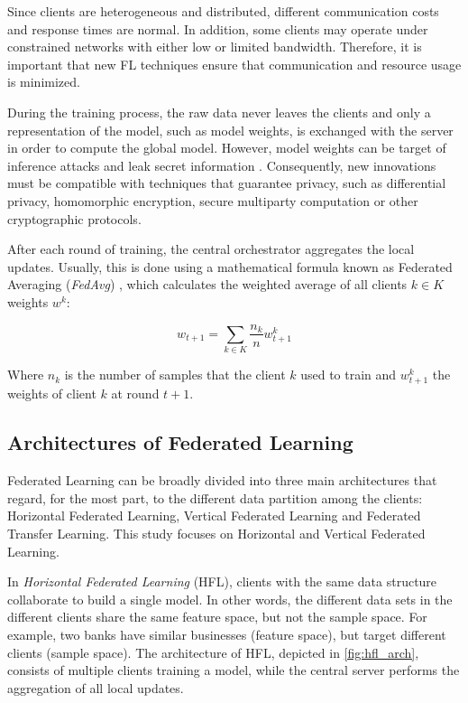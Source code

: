 Since clients are heterogeneous and distributed, different communication costs and response times are normal. In addition, some clients may operate under constrained networks with either low or limited bandwidth. Therefore, it is important that new FL techniques ensure that communication and resource usage is minimized.

During the training process, the raw data never leaves the clients and only a representation of the model, such as model weights, is exchanged with the server in order to compute the global model. However, model weights can be target of inference attacks and leak secret information \cite{10.1145/3298981}.  Consequently, new innovations must be compatible with techniques that guarantee privacy, such as differential privacy, homomorphic encryption, secure multiparty computation or other cryptographic protocols.

After each round of training, the central orchestrator aggregates the local updates. Usually, this is done using a mathematical formula known as Federated Averaging (\textit{FedAvg}) \cite{10.48550/arxiv.1602.05629}, which calculates the weighted average of all clients $k \in K$ weights $w^k$:

\begin{equation}
w_{t+1} = \sum_{k \in K} \frac{n_k}{n} w_{t+1}^k
\end{equation} \label{eq:fedavg}

Where $n_k$ is the number of samples that the client $k$ used to train and $w_{t+1}^k$ the weights of client $k$ at round $t+1$.

\subsection{Architectures of Federated Learning}\label{background:archfl}

Federated Learning can be broadly divided into three main architectures \cite{10.1145/3298981, 10.1145/3412357} that regard, for the most part, to the different data partition among the clients: Horizontal Federated Learning, Vertical Federated Learning and Federated Transfer Learning. This study focuses on Horizontal and Vertical Federated Learning.

In \textit{Horizontal Federated Learning} (HFL), clients with the same data structure collaborate to build a single model. In other words, the different data sets in the different clients share the same feature space, but not the sample space. For example, two banks have similar businesses (feature space), but target different clients (sample space). The architecture of HFL, depicted in \autoref{fig:hfl_arch}, consists of multiple clients training a model, while the central server performs the aggregation of all local updates.

